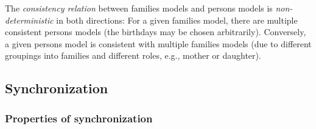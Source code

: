 The \emph{consistency relation} between families models and persons models is \emph{non-deterministic} in both directions: For a given families model, there are multiple consistent persons models (the birthdays may be chosen arbitrarily). Conversely, a given persons model is consistent with multiple families models (due to different groupings into families and different roles, e.g., mother or daughter).

\subsection{Synchronization}
\label{sec:ConsistencyRestoration}

%

\subsubsection{Properties of synchronization}


